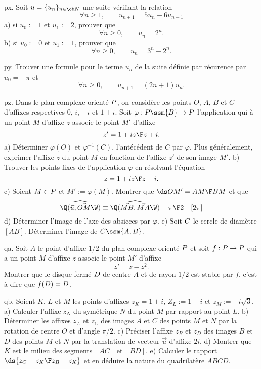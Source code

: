 \exo [Level=1,Fight=1,Learn=1,Field=\Suites,Type=\Exercices,Origin=] px. Soit $u=\{u_n\}_{n\in\ob N}$ une suite vérifiant la relation 
$$
\forall n\ge1, \qquad u_{n+1}=5u_n-6u_{n-1}
$$
a) si $u_0:=1$ et $u_1:=2$, prouver que  
$$
\forall n\ge0, \qquad u_n=2^n.
$$
b) si $u_0:=0$ et $u_1:=1$, prouver que 
$$
\forall n\ge0, \qquad u_n=3^n-2^n.
$$

\exo [Level=1,Fight=1,Learn=1,Field=\Suites,Type=\Exercices,Origin=] py. 
Trouver une formule pour le terme $u_n$ de la suite définie par récurence par $u_0=-\pi$ et 
$$
\forall n\ge0, \qquad u_{n+1}=(2n+1)u_n. 
$$

\exo [Level=1,Fight=1,Learn=1,Field=\NombresComplexes,Type=\Problèmes,Origin=] pz. 
Dans le plan complexe orienté $\sc P$, on considère les points $O$, $A$, $B$ et $C$ d'affixes respectives $0$, $i$, $-i$ 
et $1+i$. Soit $\varphi:\sc P\ssm\{B\}\to\sc P$ l'application qui à un point $M$ d'affixe $z$ associe le point $M'$ d'affixe 
$$
z'={1+iz\F z+i}.
$$
a) Déterminer $\varphi(O)$ et $\varphi^{-1}(C)$, l'antécédent de $C$ par $\varphi$. Plus généralement, exprimer l'affixe $z$ 
du point $M$ en fonction de l'affixe $z'$ de son image $M'$. \pn
b) Trouver les points fixes de l'application $\varphi$ en résolvant l'équation 
$$
z={1+iz\F z+i}.
$$
c) Soient $M\in\sc P$ et $M':=\varphi(M)$. Montrer que $\ds OM'={AM\F BM}$ et que 
$$
\Q(\widehat{\vec u,\vec{OM}}\W)\equiv \Q(\widehat{\vec{MB},\vec{MA}}\W)+{\pi\F2}\quad[2\pi]
$$
d) Déterminer l'image de l'axe des absicces par $\varphi$. \pn
e) Soit $\sc C$ le cercle de diamètre $[AB]$. Déterminer l'image de $\sc C\ssm\{A,B\}$. 


\exo  [Level=1,Fight=1,Learn=1,Field=\NombresComplexes,Type=\Exercices,Origin=] qa. 
Soit $A$ le point d'affixe $1/2$ du plan complexe orienté $\sc P$ et soit $f:\sc P\to\sc P$ 
qui a un point $M$ d'affixe $z$ associe le point $M'$ d'affixe 
$$
z'=z-z^2. 
$$
Montrer que le disque fermé $\sc D$ de centre $A$ et de rayon $1/2$ est stable par $f$, c'est à dire que $f(\sc D)=\sc D$. 


\exo  [Level=1,Fight=1,Learn=1,Field=\NombresComplexes,Type=\Problèmes,Origin=] qb. 
Soient $K$, $L$ et $M$ les points d'affixes  $z_K=1+i$, $Z_L:=1-i$ et $z_M:=-i\sqrt3$. \pn 
a) Calculer l'affixe $z_N$ du symétrique $N$ du point $M$ par rapport au point $L$. \pn
b) Déterminer les affixes $z_A$ et $z_C$ des images $A$ et $C$ 
des points $M$ et $N$ par la rotation de centre $O$ et d'angle $\pi/2$.  \pn
c) Préciser l'affixe $z_B$ et $z_D$ des images $B$ et $D$ des points $M$ et $N$ par la translation de vecteur $\vec u$ d'affixe $2i$. 
\pn
d) Montrer que $K$ est le milieu des segments $[AC]$ et $[BD]$. \pn
e) Calculer le rapport $\ds{z_C-z_K\F z_B-z_K}$ et en déduire la nature du quadrilatère $ABCD$. 


